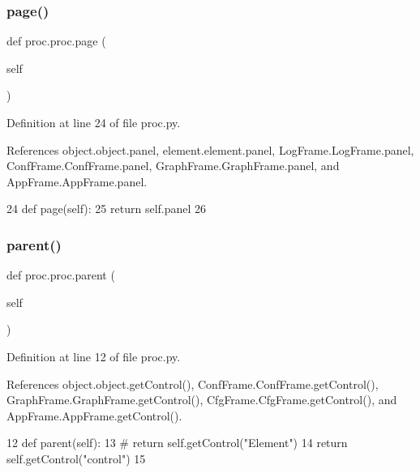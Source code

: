 \subsubsection{\texorpdfstring{page()}{page()}}
{\footnotesize\ttfamily def proc.\+proc.\+page (\begin{DoxyParamCaption}\item[{}]{self }\end{DoxyParamCaption})}



Definition at line 24 of file proc.\+py.



References object.\+object.\+panel, element.\+element.\+panel, Log\+Frame.\+Log\+Frame.\+panel, Conf\+Frame.\+Conf\+Frame.\+panel, Graph\+Frame.\+Graph\+Frame.\+panel, and App\+Frame.\+App\+Frame.\+panel.


\begin{DoxyCode}
24     \textcolor{keyword}{def }page(self):
25         \textcolor{keywordflow}{return} self.panel
26 \end{DoxyCode}
\mbox{\label{classproc_1_1proc_a997ae1c4cc88dfe9e361897bf471ca0f}} 
\subsubsection{\texorpdfstring{parent()}{parent()}}
{\footnotesize\ttfamily def proc.\+proc.\+parent (\begin{DoxyParamCaption}\item[{}]{self }\end{DoxyParamCaption})}



Definition at line 12 of file proc.\+py.



References object.\+object.\+get\+Control(), Conf\+Frame.\+Conf\+Frame.\+get\+Control(), Graph\+Frame.\+Graph\+Frame.\+get\+Control(), Cfg\+Frame.\+Cfg\+Frame.\+get\+Control(), and App\+Frame.\+App\+Frame.\+get\+Control().


\begin{DoxyCode}
12     \textcolor{keyword}{def }parent(self):
13 \textcolor{comment}{#        return self.getControl("Element")   }
14         \textcolor{keywordflow}{return} self.getControl(\textcolor{stringliteral}{"control"})
15 
\end{DoxyCode}



